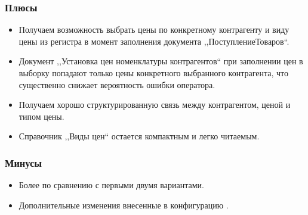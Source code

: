 \subsubsection{Плюсы}
\begin{itemize}	
\item Получаем возможность выбрать цены по конкретному контрагенту и виду цены  из регистра в момент заполнения документа ,,ПоступлениеТоваров``.

\item Документ ,,Установка цен номенклатуры контрагентов`` при заполнении цен в выборку попадают только цены конкретного выбранного контрагента, что существенно снижает вероятность ошибки оператора.
\item Получаем хорошо структурированную связь между контрагентом, ценой и типом цены.	
\item Справочник ,,Виды цен`` остается компактным и легко читаемым.
\end{itemize}
\subsubsection{Минусы}
\begin{itemize}	
\item Более    по сравнению с первыми двумя вариантами.
\item Дополнительные изменения внесенные в конфигурацию .
\end{itemize}
